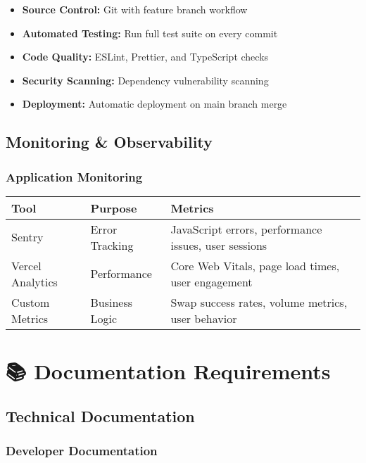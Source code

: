 \documentclass[12pt,a4paper]{article}
\begin{document}
\begin{itemize}
    \item \textbf{Source Control:} Git with feature branch workflow
    \item \textbf{Automated Testing:} Run full test suite on every commit
    \item \textbf{Code Quality:} ESLint, Prettier, and TypeScript checks
    \item \textbf{Security Scanning:} Dependency vulnerability scanning
    \item \textbf{Deployment:} Automatic deployment on main branch merge
\end{itemize}

\subsection{Monitoring \& Observability}

\subsubsection{Application Monitoring}

\begin{longtable}{|p{3cm}|p{3cm}|p{7cm}|}
\hline
\textbf{Tool} & \textbf{Purpose} & \textbf{Metrics} \\
\hline
\endhead

Sentry & Error Tracking & JavaScript errors, performance issues, user sessions \\
\hline
Vercel Analytics & Performance & Core Web Vitals, page load times, user engagement \\
\hline
Custom Metrics & Business Logic & Swap success rates, volume metrics, user behavior \\
\hline
\end{longtable}

\section{📚 Documentation Requirements}

\subsection{Technical Documentation}

\subsubsection{Developer Documentation}
\end{document}
